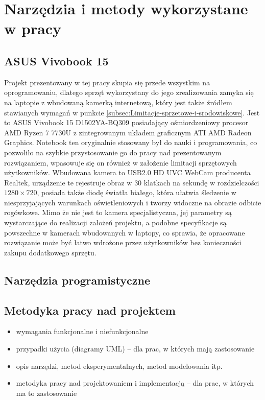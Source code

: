 \documentclass[a4paper,twoside,12pt]{book}
\begin{document}
\section{Narzędzia i metody wykorzystane w pracy}
\label{sec:Narzedzia-i-metody-wykorzystane-w-pracy}

\subsection{ASUS Vivobook 15}
\label{subsec:ASUS-Vivobook-15}

Projekt prezentowany w tej pracy skupia się przede wszystkim na oprogramowaniu, dlatego sprzęt wykorzystany do jego zrealizowania zamyka się na laptopie z wbudowaną kamerką internetową, który jest także źródłem stawianych wymagań w punkcie \ref{subsec:Limitacje-sprzetowe-i-srodowiskowe}. Jest to ASUS Vivobook 15 D1502YA-BQ309 posiadający ośmiordzeniowy procesor AMD Ryzen 7 7730U z zintegrowanym układem graficznym ATI AMD Radeon Graphics. Notebook ten oryginalnie stosowany był do nauki i programowania, co pozwoliło na szybkie przystosowanie go do pracy nad prezentowanym rozwiązaniem, wpasowuje się on również w założenie limitacji sprzętowych użytkowników. Wbudowana kamera to USB2.0 HD UVC WebCam producenta Realtek, urządzenie te rejestruje obraz w $30$ klatkach na sekundę w rozdzielczości $1280 \times 720$, posiada także diodę światła białego, która ułatwia śledzenie w niesprzyjających warunkach oświetleniowych i tworzy widoczne na obrazie odbicie rogówkowe. Mimo że nie jest to kamera specjalistyczna, jej parametry są wystarczające do realizacji założeń projektu, a podobne specyfikacje są powszechne w kamerach wbudowanych w laptopy, co sprawia, że opracowane rozwiązanie może być łatwo wdrożone przez użytkowników bez konieczności zakupu dodatkowego sprzętu.

\subsection{Narzędzia programistyczne}



\subsection{Metodyka pracy nad projektem}


\begin{itemize}
\item wymagania funkcjonalne i niefunkcjonalne
\item przypadki użycia (diagramy UML) -- dla prac, w których mają zastosowanie
\item opis narzędzi, metod eksperymentalnych, metod modelowania itp.
\item metodyka pracy nad projektowaniem i implementacją -- dla prac, w których ma to zastosowanie
\end{itemize}
\end{document}

